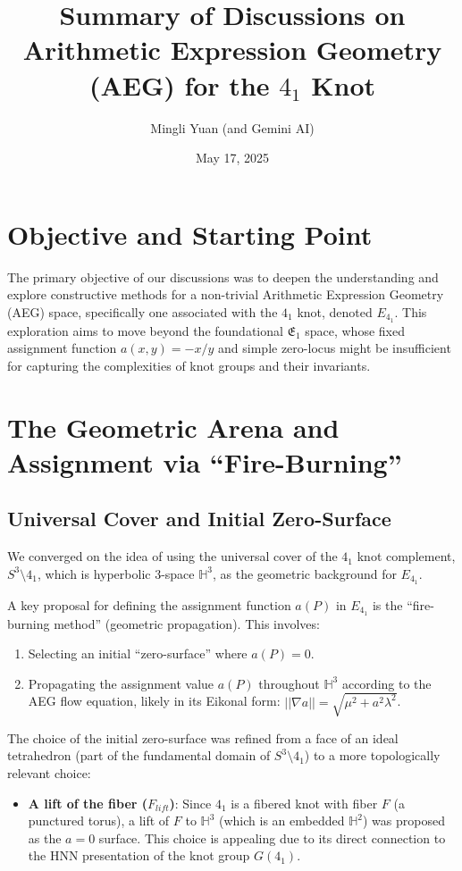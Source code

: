 \documentclass[12pt, a4paper]{article}
\title{Summary of Discussions on Arithmetic Expression Geometry (AEG) for the $4_1$ Knot}
\author{Mingli Yuan (and Gemini AI)}
\date{May 17, 2025} %
\begin{document}
\maketitle

\section{Objective and Starting Point}
The primary objective of our discussions was to deepen the understanding and explore constructive methods for a non-trivial Arithmetic Expression Geometry (AEG) space, specifically one associated with the $4_1$ knot, denoted $E_{4_1}$. This exploration aims to move beyond the foundational $\mathfrak{E}_1$ space, whose fixed assignment function $a(x,y) = -x/y$ and simple zero-locus might be insufficient for capturing the complexities of knot groups and their invariants.

\section{The Geometric Arena and Assignment via ``Fire-Burning''}
\subsection{Universal Cover and Initial Zero-Surface}
We converged on the idea of using the universal cover of the $4_1$ knot complement, $S^3 \setminus 4_1$, which is hyperbolic 3-space $\mathbb{H}^3$, as the geometric background for $E_{4_1}$.

A key proposal for defining the assignment function $a(P)$ in $E_{4_1}$ is the ``fire-burning method'' (geometric propagation). This involves:
\begin{enumerate}
    \item Selecting an initial ``zero-surface'' where $a(P)=0$.
    \item Propagating the assignment value $a(P)$ throughout $\mathbb{H}^3$ according to the AEG flow equation, likely in its Eikonal form: $||\nabla a|| = \sqrt{\mu^2 + a^2 \lambda^2}$.
\end{enumerate}
The choice of the initial zero-surface was refined from a face of an ideal tetrahedron (part of the fundamental domain of $S^3 \setminus 4_1$) to a more topologically relevant choice:
\begin{itemize}
    \item \textbf{A lift of the fiber ($F_{lift}$)}: Since $4_1$ is a fibered knot with fiber $F$ (a punctured torus), a lift of $F$ to $\mathbb{H}^3$ (which is an embedded $\mathbb{H}^2$) was proposed as the $a=0$ surface. This choice is appealing due to its direct connection to the HNN presentation of the knot group $G(4_1)$.
\end{itemize}
\end{document}
